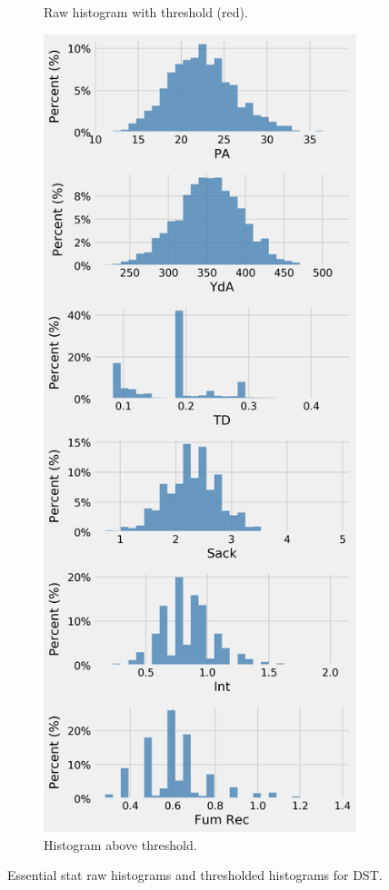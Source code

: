 \documentclass[12pt]{article}
\begin{document}
\begin{figure}[H]
\begin{subfigure}[b]{0.450\textwidth}
    \caption{Raw histogram with threshold (red).}
  \end{subfigure}
  \hfill
  \begin{subfigure}[b]{0.450\textwidth}
    \centering
    \includegraphics[width=1\textwidth]{../figures/threshold_hist_DST}
    \caption{Histogram above threshold.}
  \end{subfigure}
  \caption{Essential stat raw histograms and thresholded histograms for DST.}
\end{figure}

\pagebreak
\end{document}
